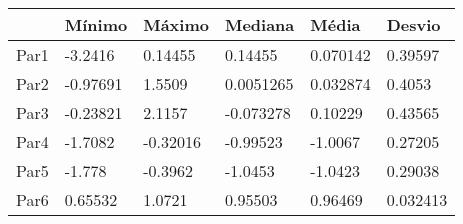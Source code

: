 \begin{tabular}{llllll}
& Mínimo & Máximo & Mediana & Média & Desvio \\ 
\hline 
Par1 & -3.2416 & 0.14455 & 0.14455 & 0.070142 & 0.39597 \\ 
Par2 & -0.97691 & 1.5509 & 0.0051265 & 0.032874 & 0.4053 \\ 
Par3 & -0.23821 & 2.1157 & -0.073278 & 0.10229 & 0.43565 \\ 
Par4 & -1.7082 & -0.32016 & -0.99523 & -1.0067 & 0.27205 \\ 
Par5 & -1.778 & -0.3962 & -1.0453 & -1.0423 & 0.29038 \\ 
Par6 & 0.65532 & 1.0721 & 0.95503 & 0.96469 & 0.032413 \\ 
\hline 
\end{tabular}